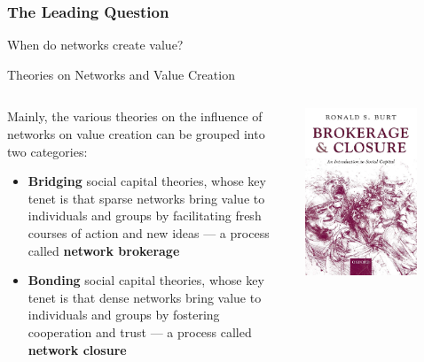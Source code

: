 \documentclass[notes, aspectratio=1610]{beamer}
\begin{document}
\begin{frame}
	\frametitle{The Leading Question}
		\begin{center}
			\Large When do networks create value?
		\end{center}
\end{frame}

\begin{frame}{Theories on Networks and Value Creation}
\begin{columns}
	\begin{column}{0.5\textwidth}
	Mainly, the various theories on the influence of networks on value 
	creation can be grouped into two categories:

	\vspace{1em}

	\begin{itemize}
		\item \textbf{Bridging} social capital theories, whose key 
		      tenet is that sparse networks bring value to 
		      individuals and groups by facilitating fresh courses 
		      of action and new ideas --- a process called 
		      \textbf{network brokerage} 
		\item \textbf{Bonding} social capital theories, whose key 
		      tenet is that dense networks bring value to 
		      individuals and groups by fostering cooperation and trust
		      ---  a process called \textbf{network closure}
	\end{itemize}
	\end{column}
	\begin{column}{0.5\textwidth}
		\centering
		\includegraphics[width=0.75\textwidth]{images/brokerage_and_closure.jpeg}
	\end{column}
\end{columns}
\end{frame}
\end{document}
